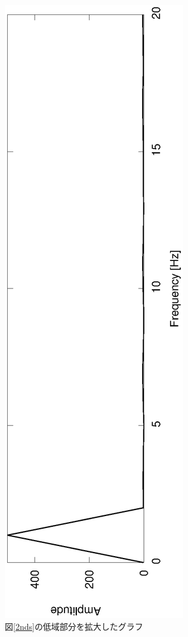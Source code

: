 \documentclass[a4j]{jsarticle}
\begin{document}
\vspace{-5mm}
\begin{figure}[H]
 \centering
 \vspace{-4cm}
 \hspace{-2cm}
 \includegraphics[angle=-90,scale=0.6]{2ndout_spec_kakudai.eps}
  \vspace{-2.2cm}
 \caption{図\ref{2nds}の低域部分を拡大したグラフ}
 \label{2ndsk}
\end{figure}
\vspace{-5mm}
\end{document}
